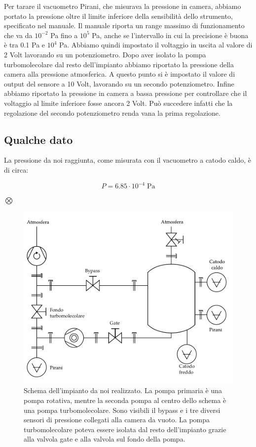 Per tarare il vacuometro Pirani, che misurava la pressione in camera, abbiamo portato la pressione oltre il limite inferiore
della sensibilità dello strumento, specificato nel manuale. Il manuale riporta un range massimo di funzionamento che va da $10^{-2}$ \si{\pascal} fino a $10^5$ \si{\pascal}, anche se l'intervallo in cui la precisione è buona è tra 0.1 \si{\pascal} e $10^4$ \si{\pascal}. Abbiamo quindi impostato il voltaggio in uscita al valore di 2 Volt lavorando su un potenziometro. Dopo aver isolato la pompa turbomolecolare dal resto dell'impianto abbiamo riportato la pressione della camera alla pressione atmosferica. A questo punto si è impostato il valore di output del sensore a 10 Volt, lavorando su un secondo potenziometro. Infine abbiamo riportato la pressione in camera a bassa pressione per controllare che il voltaggio al limite inferiore fosse ancora 2 Volt. Può succedere infatti che la regolazione del secondo potenziometro renda vana la prima regolazione.

\subsection{Qualche dato}

La pressione da noi raggiunta, come misurata con il vacuometro a catodo caldo, è di circa:

\begin{equation}
    P = 6.85 \cdot 10^{-4} \; \si{\pascal}
\end{equation}

$\bigotimes$

\begin{figure}[b!]
    \centering
   \includegraphics[width=16cm]{drawing.pdf}
   \caption{Schema dell'impianto da noi realizzato. La pompa primaria è una pompa rotativa, mentre la seconda pompa al centro dello schema
   è una pompa turbomolecolare. Sono visibili il bypass e i tre diversi sensori di pressione collegati alla camera da vuoto. La pompa
   turbomolecolare poteva essere isolata dal resto dell'impianto grazie alla valvola gate e alla valvola sul fondo della pompa.}
   \label{fig:schema}
\end{figure}

